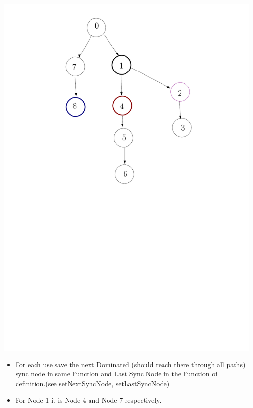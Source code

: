 \documentclass[12pt]{beamer}
\begin{document}
\begin{frame}[plain]
  \includegraphics[scale=0.3]{start2.pdf}
  \begin{itemize}
  \item For each use save the next Dominated (should reach there through all paths)
    sync node in same Function and Last Sync Node
    in the Function of definition.(see setNextSyncNode, setLastSyncNode)
  \item For Node 1 it is Node 4 and Node 7 respectively.
  \end{itemize}
\end{frame}
\end{document}
